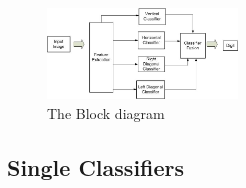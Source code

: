 \documentclass[conference]{IEEEtran}
\begin{document}


 \begin{figure}
\centering
\label{fig:block}
\includegraphics[width=0.45\textwidth]{BlockDiagram.jpg}
 \caption{The Block diagram }
\end{figure}


\subsection{Single Classifiers}
\end{document}

